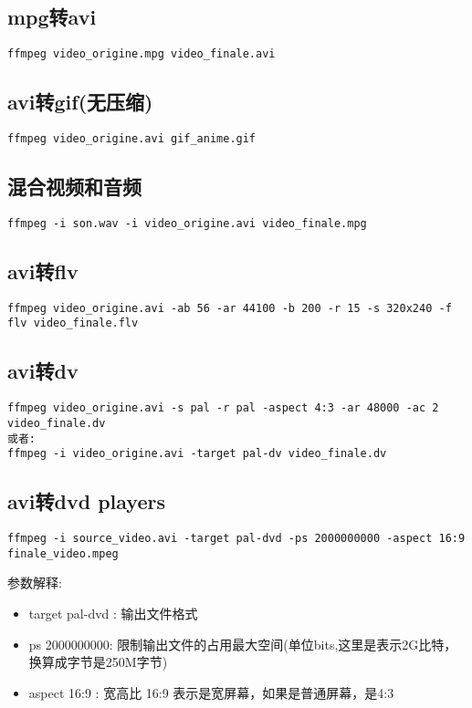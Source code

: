 \documentclass[adobefonts]{ctexart}
\begin{document}
\subsection{mpg转avi}
\begin{verbatim}
ffmpeg video_origine.mpg video_finale.avi
\end{verbatim}

\subsection{avi转gif(无压缩)}
\begin{verbatim}
ffmpeg video_origine.avi gif_anime.gif
\end{verbatim}

\subsection{混合视频和音频}
\begin{verbatim}
ffmpeg -i son.wav -i video_origine.avi video_finale.mpg
\end{verbatim}

\subsection{avi转flv}
\begin{verbatim}
ffmpeg video_origine.avi -ab 56 -ar 44100 -b 200 -r 15 -s 320x240 -f flv video_finale.flv
\end{verbatim}

\subsection{avi转dv}
\begin{verbatim}
ffmpeg video_origine.avi -s pal -r pal -aspect 4:3 -ar 48000 -ac 2 video_finale.dv
或者:
ffmpeg -i video_origine.avi -target pal-dv video_finale.dv
\end{verbatim}

\subsection{avi转dvd players}
\begin{verbatim}
ffmpeg -i source_video.avi -target pal-dvd -ps 2000000000 -aspect 16:9 finale_video.mpeg
\end{verbatim}
参数解释:
\begin{itemize}
\item target pal-dvd : 输出文件格式
\item ps 2000000000: 限制输出文件的占用最大空间(单位bits,这里是表示2G比特，换算成字节是250M字节)
\item aspect 16:9 : 宽高比 16:9 表示是宽屏幕，如果是普通屏幕，是4:3
\end{itemize}
\end{document}

